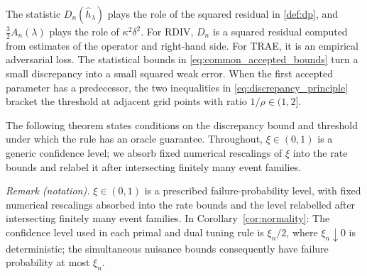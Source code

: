 \documentclass[12pt]{article}
\theoremstyle{plain}
\theoremstyle{definition}
\theoremstyle{remark}
\begin{document}
The statistic $D_n(\hat h_\lambda)$ plays the role of the squared residual in \cref{def:dp}, and $\tfrac32A_n(\lambda)$ plays the role of $\kappa^2\delta^2$. For RDIV, $D_n$ is a squared residual computed from estimates of the operator and right-hand side. For TRAE, it is an empirical adversarial loss. The statistical bounds in \eqref{eq:common_accepted_bounds} turn a small discrepancy into a small squared weak error. When the first accepted parameter has a predecessor, the two inequalities in \eqref{eq:discrepancy_principle} bracket the threshold at adjacent grid points with ratio $1/\rho\in(1,2]$.

The following theorem states conditions on the discrepancy bound and threshold under which the rule has an oracle guarantee. Throughout, $\xi\in(0,1)$ is a generic confidence level; we absorb fixed numerical rescalings of $\xi$ into the rate bounds and relabel it after intersecting finitely many event families.

\noindent\textit{Remark (notation).} $\xi\in(0,1)$ is a prescribed failure-probability level, with fixed numerical rescalings absorbed into the rate bounds and the level relabelled after intersecting finitely many event families. In Corollary~\ref{cor:normality}: The confidence level used in each primal and dual tuning rule is $\xi_n/2$, where $\xi_n\downarrow0$ is deterministic; the simultaneous nuisance bounds consequently have failure probability at most $\xi_n$.
\end{document}
